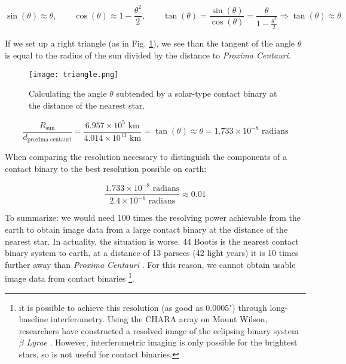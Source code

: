 \documentclass[12pt]{article} %
\numberwithin{equation}{section} %
\begin{document}
\begin{equation} \label{eqn: smallangle}
\sin(\theta) \approx \theta, \qquad \cos(\theta) \approx 1 - \frac{\theta^{2}}{2}, \qquad \tan(\theta) = \frac{\sin(\theta)}{\cos(\theta)} = \frac{\theta}{1 - \frac{\theta^{2}}{2}} \Rightarrow \tan(\theta) \approx \theta
\end{equation}

If we set up a right triangle (as in Fig. \ref{fig: triangle}), we see than the tangent of the angle $\theta$ is equal to the radius of the sun divided by the distance to \emph{Proxima Centauri}.

\begin{figure}[H]
\centering
\texttt{[image: triangle.png]}
\caption{Calculating the angle $\theta$ subtended by a solar-type contact binary at the distance of the nearest star.}
\label{fig: triangle}
\end{figure}

\begin{equation} \label{eqn: example_angle}
\frac{R_{\text{sun}}}{d_{\text{proxima centauri}}} = \frac{6.957 \times 10^{5} \text{ km}}{4.014 \times 10^{13} \text{ km}} = \tan(\theta) \approx \theta = 1.733 \times 10^{-8} \text{ radians}
\end{equation}

When comparing the resolution necessary to distinguish the components of a contact binary to the best resolution possible on earth:

\begin{equation} \label{eqn: resolution_comparison}
\frac{1.733 \times 10^{-8} \text{ radians}}{2.4 \times 10^{-6} \text{ radians}} \approx 0.01
\end{equation}

To summarize: we would need 100 times the resolving power achievable from the earth to obtain image data from a large contact binary at the distance of the nearest star. In actuality, the situation is worse. 44 Bootis is the nearest contact binary system to earth, at a distance of 13 parsecs (42 light years) it is 10 times further away than \emph{Proxima Centauri} \citep{eker2008new}. For this reason, we cannot obtain usable image data from contact binaries \footnote{it is possible to achieve this resolution (as good as 0.0005") through long-baseline interferometry. Using the CHARA array on Mount Wilson, researchers have constructed a resolved image of the eclipsing binary system $\beta$ \emph{Lyrae}  \citep{zhao2008first}. However, interferometric imaging is only possible for the brightest stars, so is not useful for contact binaries.}.
\end{document}
